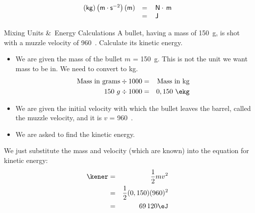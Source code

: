     \begin{equation}
    \begin{array}{ccc}\hfill \left(\mathsf{kg}\right)\left(\mathsf{m}\ensuremath{\cdot}{\mathsf{s}}^{-2}\right)\left(\mathsf{m}\right)& =& \phantom{\rule{0.166667em}{0ex}}\mathsf{N}\ensuremath{\cdot}\phantom{\rule{0.166667em}{0ex}}\mathsf{m}\hfill \\ & =& \phantom{\rule{0.166667em}{0ex}}\mathsf{J}\hfill \end{array}
      \end{equation}
\par
            \label{m38785*secfhsst!!!underscore!!!id1394}\vspace{.5cm} 
      \noindent
\begin{wex}{Mixing Units \&\ Energy Calculations }{A bullet, having a mass of 150~g, is shot with a muzzle velocity of 960~\ms. Calculate its kinetic energy.}
{
\begin{itemize}
\item We are given the mass of the bullet $m$ = 150~g. This is not the
unit we want mass to be in. We need to convert to kg.
\begin{eqnarray*}
\rm{Mass~in~grams} \div 1000 &=& \rm{Mass~in~kg}\\
150~g \div 1000 &=& 0,150~\ekg
\end{eqnarray*}

\item We are given the initial velocity with which the bullet leaves the barrel, called the muzzle velocity, and it is $v$ = 960~\ms.
\end{itemize}
\begin{itemize}
\item We are asked to find the kinetic energy.
\end{itemize}

We just substitute the mass and velocity (which are known) into the equation for kinetic energy:
\begin{eqnarray*}
\kener & = & \frac{1}{2}mv^2 \\
&= & \frac{1}{2}(0,150)(960)^2 \\
&=& 69\,120\eJ
\end{eqnarray*}}
\end{wex}
    \noindent
\label{m38785*secfhsst!!!underscore!!!id1491}
